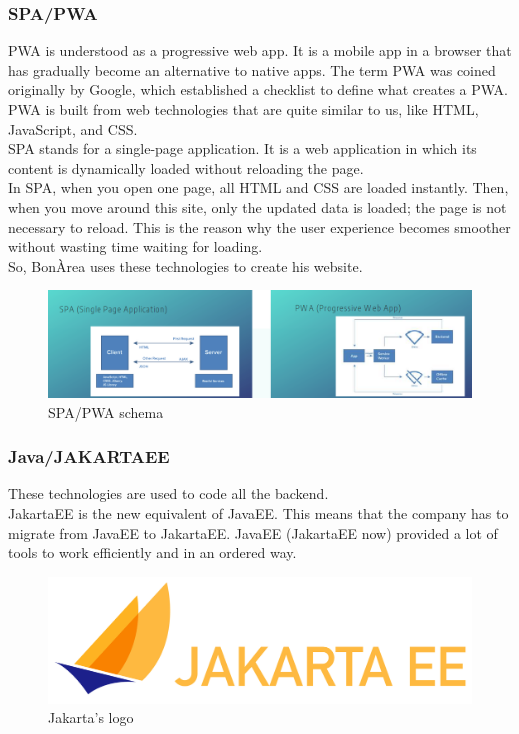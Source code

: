 \documentclass[12pt]{article}
\begin{document}
\subsubsection*{SPA/PWA}
PWA is understood as a progressive web app. It is a mobile app in a browser that has gradually become an alternative to native apps. The term PWA was coined originally by Google, which established a checklist to define what creates a PWA. PWA is built from web technologies that are quite similar to us, like HTML, JavaScript, and CSS.\\
SPA stands for a single-page application. It is a web application in which its content is dynamically loaded without reloading the page.\\
In SPA, when you open one page, all HTML and CSS are loaded instantly. Then, when you move around this site, only the updated data is loaded; the page is not necessary to reload. This is the reason why the user experience becomes smoother without wasting time waiting for loading.\\
So, BonÀrea uses these technologies to create his website.
\begin{figure}[H]
    \centering
    \includegraphics[scale = 0.45]{Images/spa-pwa.png}
    \caption{SPA/PWA schema}
    \label{fig:spa-pwa}
\end{figure}
\subsubsection*{Java/JAKARTAEE}
These technologies are used to code all the backend.\\
JakartaEE is the new equivalent of JavaEE. This means that the company has to migrate from JavaEE to JakartaEE. JavaEE (JakartaEE now) provided a lot of tools to work efficiently and in an ordered way.
\begin{figure}[H]
    \centering
    \includegraphics[scale = 0.7]{Images/jakarta ee-1.jpg}
    \caption{Jakarta's logo}
    \label{fig:jakarta}
\end{figure}
\end{document}
